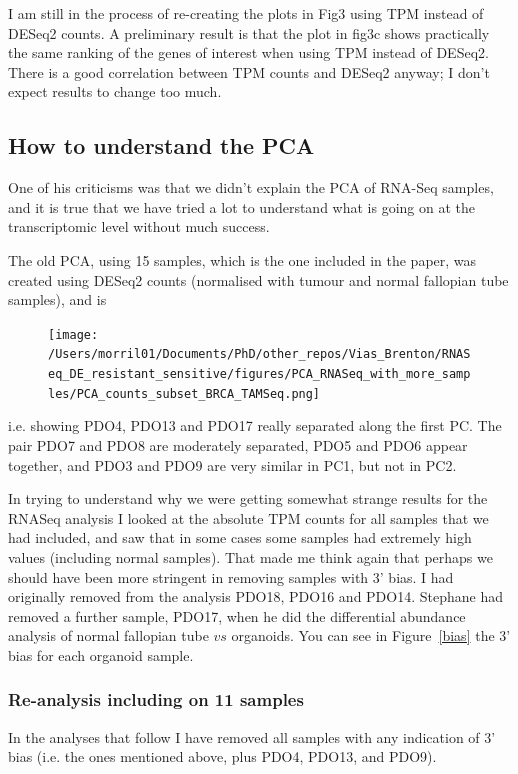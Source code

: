 \documentclass{article}
\begin{document}
I am still in the process of re-creating the plots in Fig3 using TPM instead of DESeq2 counts. A preliminary result is that the plot in fig3c shows practically the same ranking of the genes of interest when using TPM instead of DESeq2. There is a good correlation between TPM counts and DESeq2 anyway; I don't expect results to change too much.

\subsection{How to understand the PCA}
One of his criticisms was that we didn't explain the PCA of RNA-Seq samples, and it is true that we have tried a lot to understand what is going on at the transcriptomic level without much success.

The old PCA, using 15 samples, which is the one included in the paper, was created using DESeq2 counts (normalised with tumour and normal fallopian tube samples), and is

\begin{figure}[h]
\centering
\texttt{[image: /Users/morril01/Documents/PhD/other\_repos/Vias\_Brenton/RNASeq\_DE\_resistant\_sensitive/figures/PCA\_RNASeq\_with\_more\_samples/PCA\_counts\_subset\_BRCA\_TAMSeq.png]}
\end{figure}

i.e. showing PDO4, PDO13 and PDO17 really separated along the first PC. The pair PDO7 and PDO8 are moderately separated, PDO5 and PDO6 appear together, and PDO3 and PDO9 are very similar in PC1, but not in PC2.

In trying to understand why we were getting somewhat strange results for the RNASeq analysis I looked at the absolute TPM counts for all samples that we had included, and saw that in some cases some samples had extremely high values (including normal samples). That made me think again that perhaps we should have been more stringent in removing samples with 3' bias. I had originally removed from the analysis PDO18, PDO16 and PDO14. Stephane had removed a further sample, PDO17, when he did the differential abundance analysis of normal fallopian tube $vs$ organoids. You can see in Figure~\ref{bias} the 3' bias for each organoid sample.
\clearpage

\subsubsection{Re-analysis including on 11 samples}
In the analyses that follow I have removed all samples with any indication of 3' bias (i.e. the ones mentioned above, plus PDO4, PDO13, and PDO9).
\end{document}
